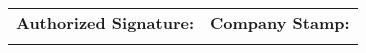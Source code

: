 \documentclass{article}
\begin{document}
        \vspace{1em}

        \noindent
        \begin{tabular}{@{}p{}p{}@{}}
            \textbf{Authorized Signature:} & \textbf{Company Stamp:} \\
            \vspace{2cm} & \vspace{2cm} \\
        \end{tabular}

        
\end{document}
